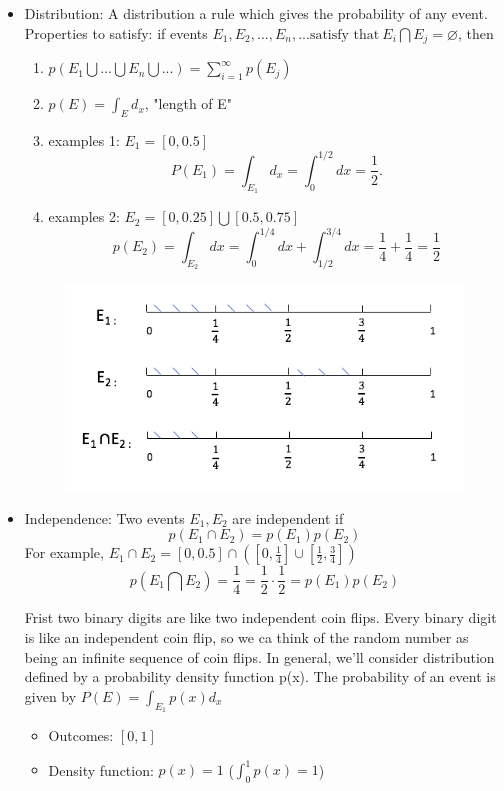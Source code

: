 \begin{itemize}
	\item Distribution: \newline
	A distribution a rule which gives the probability of any event. \newline
	Properties to satisfy: if events $E_{1}, E_{2}, ..., E_{n},...  \mbox{satisfy that}  \ E_{i} \bigcap E_{j}= \varnothing $, then 
	\begin{enumerate}
	\item $ p(E_{1} \bigcup ... \bigcup E_{n} \bigcup ...) = \sum_{i=1}^{\infty}p(E_{j})$
	\item $p(E)=\int_{E} d_{x}$, "length of E" 
	\item examples 1: $E_{1}=\left[ 0,0.5\right] $
	$$
	P\left(E_{1}\right)=\int_{E_{1}} d_{x}=\int_{0}^{1 / 2} d x=\frac{1}{2}.
	$$
	\item examples 2: $E_{2}=\left[ 0,0.25\right] \bigcup \left[ 0.5,0.75\right]$
	$$p\left(E_{2}\right)=\int_{E_{2}} d x=\int_{0}^{1 / 4} d x+\int_{1 / 2} ^{3/4}d x=\frac{1}{4}+\frac{1}{4}=\frac{1}{2}
	$$
	\end{enumerate}	
 \begin{figure}
	\centering
	\includegraphics[width=.7\textwidth]{../figures/probability2.jpeg}  
\end{figure}
\item Independence: \newline
Two events $E_{1}, E_{2}$ are independent if \newline
$$p\left(E_{1} \cap E_{2}\right)=p\left(E_{1}\right) p\left(E_{2}\right)$$
For example,
$E_{1} \cap E_{2}=[0,0.5] \cap\left(\left[0, \frac{1}{4}\right] \cup\left[\frac{1}{2}, \frac{3}{4}\right]\right)$  	
$$
p\left(E_{1}\bigcap E_{2}\right)=\frac{1}{4}=\frac{1}{2} \cdot \frac{1}{2}=p\left(E_{1}\right) p\left(E_{2}\right)
$$

Frist two binary digits are like two independent coin flips. Every binary digit is like an independent coin flip, so we ca think of the random number as being an infinite sequence of coin flips. In general, we'll consider distribution defined by a probability density function p(x). The probability of an event is given by	$P\left(E\right)=\int_{E_{1}} p(x)d_{x}$
\begin{itemize}
\item Outcomes: $\left[ 0,1\right]$
\item Density function: $p(x)=1$ ($\int_0^1 p(x)=1$)
\end{itemize}
\end{itemize}


